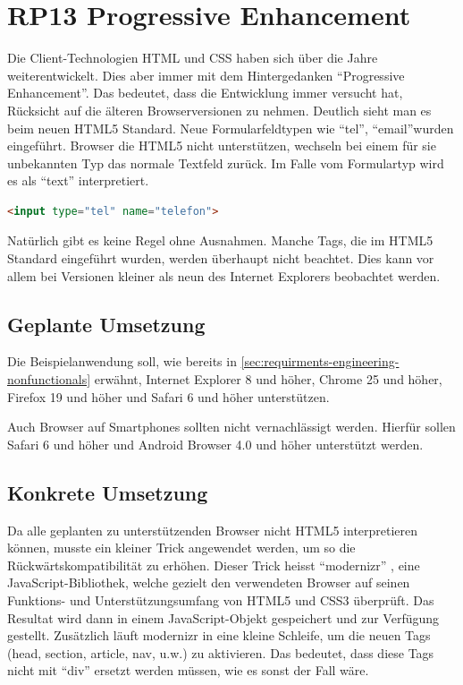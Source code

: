 \section{RP13 Progressive Enhancement}
\label{sec:principle-rp13-progressive-enhancement}

Die Client-Technologien HTML und CSS haben sich über die Jahre weiterentwickelt. Dies aber immer mit dem Hintergedanken ``Progressive Enhancement''. Das bedeutet, dass die Entwicklung immer versucht hat, Rücksicht auf die älteren Browserversionen zu nehmen.
Deutlich sieht man es beim neuen HTML5 Standard. Neue Formularfeldtypen wie ``tel'', ``email''wurden eingeführt. Browser die HTML5 nicht unterstützen, wechseln bei einem für sie unbekannten Typ das normale Textfeld zurück. Im Falle vom Formulartyp wird es als ``text'' interpretiert.

\begin{lstlisting}[language=HTML, caption={Formularfeld mit HTML5, welches eine Telefonnummer erwartet}, label={lst:html5TelInput}]
<input type="tel" name="telefon">
\end{lstlisting}

Natürlich gibt es keine Regel ohne Ausnahmen. Manche Tags, die im HTML5 Standard eingeführt wurden, werden überhaupt nicht beachtet. Dies kann vor allem bei Versionen kleiner als neun des Internet Explorers beobachtet werden.

\subsection*{Geplante Umsetzung}
Die Beispielanwendung soll, wie bereits in \ref{sec:requirments-engineering-nonfunctionals} erwähnt, Internet Explorer 8 und höher, Chrome 25 und höher, Firefox 19 und höher und Safari 6 und höher unterstützen.

Auch Browser auf Smartphones sollten nicht vernachlässigt werden. Hierfür sollen Safari 6 und höher und Android Browser 4.0 und höher unterstützt werden.

\subsection*{Konkrete Umsetzung}
Da alle geplanten zu unterstützenden Browser nicht HTML5 interpretieren können, musste ein kleiner Trick angewendet werden, um so die Rückwärtskompatibilität zu erhöhen. Dieser Trick heisst ``modernizr'' \cite{modernizr}, eine JavaScript-Bibliothek, welche gezielt den verwendeten Browser auf seinen Funktions- und Unterstützungsumfang von HTML5 und CSS3 überprüft. Das Resultat wird dann in einem JavaScript-Objekt gespeichert und zur Verfügung gestellt.  Zusätzlich läuft modernizr in eine kleine Schleife, um die neuen Tags (head, section, article, nav, u.w.) zu aktivieren. Das bedeutet, dass diese Tags nicht mit ``div'' ersetzt werden müssen, wie es sonst der Fall wäre.

